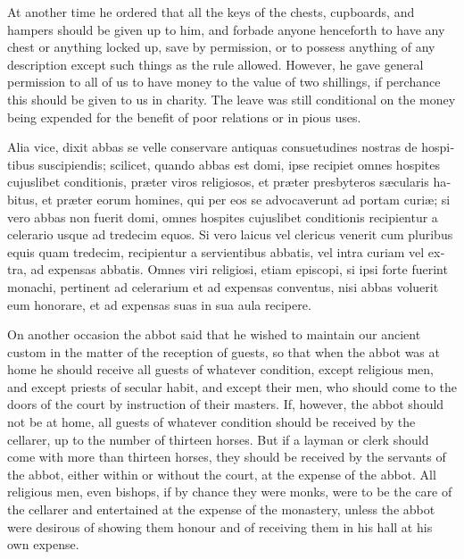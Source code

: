 \documentclass{book}
\begin{document}
\begin{paracol}{2}
\begin{otherlanguage}{latin}
\end{otherlanguage}

\switchcolumn

At another time he ordered that all the keys of the chests, cupboards, and hampers should be given up to him, and forbade anyone henceforth to have any chest or anything locked up, save by permission, or to possess anything of any description except such things as the rule allowed. However, he gave general permission to all of us to have money to the value of two shillings, if perchance this should be given to us in charity. The leave was still conditional on the money being expended for the benefit of poor relations or in pious uses.

\switchcolumn*

\begin{otherlanguage}{latin}
Alia vice, dixit abbas se velle conservare antiquas consuetudines nostras de hospitibus suscipiendis; scilicet, quando abbas est domi, ipse recipiet omnes hospites cujuslibet conditionis, pr\ae{}ter viros religiosos, et pr\ae{}ter presbyteros s\ae{}cularis habitus, et pr\ae{}ter eorum homines, qui per eos se advocaverunt ad portam curi\ae{}; si vero abbas non fuerit domi, omnes hospites cujuslibet conditionis recipientur a celerario usque ad tredecim equos. Si vero laicus vel clericus venerit cum pluribus equis quam tredecim, recipientur a servientibus abbatis, vel intra curiam vel extra, ad expensas abbatis. Omnes viri religiosi, etiam episcopi, si ipsi forte fuerint monachi, pertinent ad celerarium et ad expensas conventus, nisi abbas voluerit eum honorare, et ad expensas suas in sua aula recipere.
\end{otherlanguage}

\switchcolumn

On another occasion the abbot said that he wished to maintain our ancient custom in the matter of the reception of guests, so that when the abbot was at home he should receive all guests of whatever condition, except religious men, and except priests of secular habit, and except their men, who should come to the doors of the court by instruction of their masters. If, however, the abbot should not be at home, all guests of whatever condition should be received by the cellarer, up to the number of thirteen horses. But if a layman or clerk should come with more than thirteen horses, they should be received by the servants of the abbot, either within or without the court, at the expense of the abbot. All religious men, even bishops, if by chance they were monks, were to be the care of the cellarer and entertained at the expense of the monastery, unless the abbot were desirous of showing them honour and of receiving them in his hall at his own expense.


\end{paracol}
\end{document}
